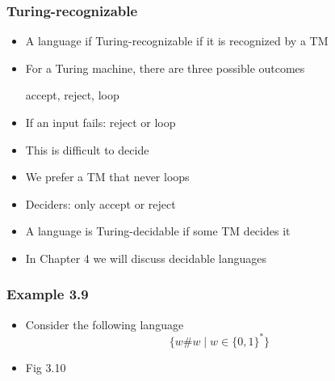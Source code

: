 




\begin{frame}[allowframebreaks] \frametitle{Turing-recognizable}
  \begin{itemize}
\item A language if Turing-recognizable if it is recognized by a TM
\item For a Turing machine, there are three possible outcomes
  \begin{center}
accept, reject, loop
\end{center}
\item If an input fails: reject or loop

\item [] This is difficult to decide
\item We prefer a TM that never loops

\item [] Deciders: only accept or reject
\item A language is Turing-decidable if some TM decides it
\item In Chapter 4 we will discuss decidable languages
  
\end{itemize}\end{frame} \begin{frame}[allowframebreaks] \frametitle{Example 3.9}
  \begin{itemize}
  \item Consider the following language
    \begin{equation*}
    \{w\# w\mid w\in \{0,1\}^*\}
  \end{equation*}

\item Fig 3.10  
 
\end{itemize}


\end{frame}
